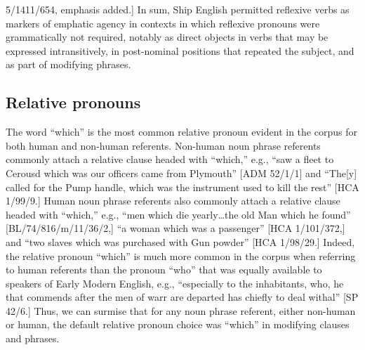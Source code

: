 5/1411/654, emphasis added.] In sum, Ship English permitted reflexive verbs as markers of emphatic agency in contexts in which reflexive pronouns were grammatically not required, notably as direct objects in verbs that may be expressed intransitively, in post-nominal positions that repeated the subject, and as part of modifying phrases. 

\subsection{\textbf{Relative} \textbf{pronouns}}%

  The word “which” is the most common relative pronoun evident in the corpus for both human and non-human referents. Non-human noun phrase referents commonly attach a relative clause headed with “which,” e.g., “saw a fleet to Cerousd which was our officers came from Plymouth” [ADM 52/1/1] and “The[y] called for the Pump handle, which was the instrument used to kill the rest” [HCA 1/99/9.] Human noun phrase referents also commonly attach a relative clause headed with “which,” e.g., “men which die yearly…the old Man which he found” [BL/74/816/m/11/36/2,] “a woman which was a passenger” [HCA 1/101/372,] and “two slaves which was purchased with Gun powder” [HCA 1/98/29.] Indeed, the relative pronoun “which” is much more common in the corpus when referring to human referents than the pronoun “who” that was equally available to speakers of Early Modern English, e.g., “especially to the inhabitants, who, he that commends after the men of warr are departed has chiefly to deal withal” [SP 42/6.] Thus, we can surmise that for any noun phrase referent, either non-human or human, the default relative pronoun choice was “which” in modifying clauses and phrases. 

